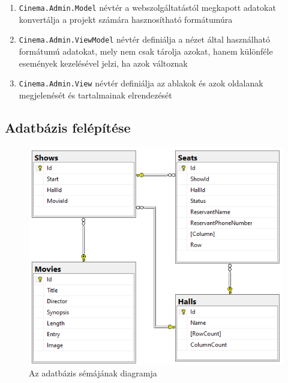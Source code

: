 \documentclass{article}
\begin{document}
\begin{itemize}
\begin{enumerate}
			\begin{enumerate}
				\item \texttt{Cinema.Admin.Model} névtér a webszolgáltatástól megkapott adatokat konvertálja a projekt számára hasznosítható formátumúra
				\item \texttt{Cinema.Admin.ViewModel} névtér definiálja a nézet által használható formátumú adatokat, mely nem csak tárolja azokat, hanem különféle események kezelésével jelzi, ha azok változnak
				\item \texttt{Cinema.Admin.View} névtér definiálja az ablakok és azok oldalanak megjelenését és tartalmainak elrendezését
			\end{enumerate}
		\end{enumerate}
	\end{itemize}
	\subsection*{Adatbázis felépítése}
	\begin{figure}[H]
		\centering
				\includegraphics[width=\textwidth]{database}
		\caption{Az adatbázis sémájának diagramja}
	\end{figure}
\end{document}
